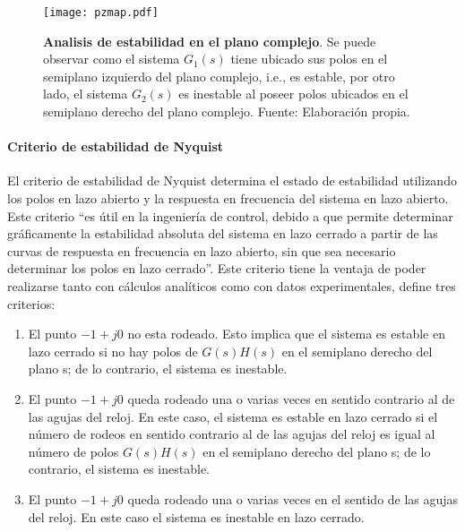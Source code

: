                 \begin{figure}[htb]
                    \centering
                    \texttt{[image: pzmap.pdf]}
                    \caption[Ejemplo de analisis de estabilidad en el plano complejo]{\textbf{Analisis de estabilidad en el plano complejo}. Se puede observar como el sistema $G_1(s)$ tiene ubicado sus polos en el semiplano izquierdo del plano complejo, i.e., es estable, por otro lado, el sistema $G_2(s)$ es inestable al poseer polos ubicados en el semiplano derecho del plano complejo. Fuente: Elaboración propia.} 
                    \label{fig:pzmap}
                \end{figure}
            
            \paragraph{Criterio de estabilidad de Nyquist}
                
                El criterio de estabilidad de Nyquist determina el estado de estabilidad utilizando los polos en lazo abierto y la respuesta en frecuencia del sistema en lazo abierto. Este criterio \enquote{es útil en la ingeniería de control, debido a que permite determinar gráficamente la estabilidad absoluta del sistema en lazo cerrado a partir de las curvas de respuesta en frecuencia en lazo abierto, sin que sea necesario determinar los polos en lazo cerrado}\Parencite[p.$\,$446]{ogata2003ingenieria}. Este criterio tiene la ventaja de poder realizarse tanto con cálculos analíticos como con datos experimentales, \textcite{ogata2003ingenieria} define tres criterios:

                \begin{enumerate}[leftmargin=\parindent]
                    \item El punto $-1 + j0$ no esta rodeado. Esto implica que el sistema es estable en lazo cerrado si no hay polos de $G(s)H(s)$ en el semiplano derecho del plano s; de lo contrario, el sistema es inestable.
                    \item El punto $-1 + j0$ queda rodeado una o varias veces en sentido contrario al de las agujas
                    del reloj. En este caso, el sistema es estable en lazo cerrado si el número de rodeos en sentido contrario
                    al de las agujas del reloj es igual al número de polos $G(s)H(s)$ en el semiplano derecho
                    del plano s; de lo contrario, el sistema es inestable.


                    \item El punto $-1 + j0$ queda rodeado una o varias veces en el sentido de las agujas del reloj.
                    En este caso el sistema es inestable en lazo cerrado.
                \end{enumerate}
                
